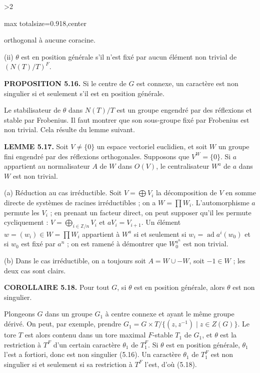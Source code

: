 \documentclass[9pt,twoside]{extarticle}
\newcommand{\EditionPage}[3]{%
  \ifnum#1>2\clearpage\fi
  \pdfbookmark[1]{Printed page #2}{fr-folio-#2}%
  \hypertarget{fr-physical-#1}{}%
  \noindent\begin{adjustbox}{max totalsize={\textwidth}{0.918\textheight},center}
  \begin{minipage}[t]{\textwidth}
  \fontsize{9.4}{11.1}\selectfont\justifying
  #3
  \end{minipage}
  \end{adjustbox}%
}
\begin{document}
\EditionPage{31}{132}{%
orthogonal à aucune coracine.\par

(ii) \(\theta\) est en position générale s'il n'est fixé par aucun élément non trivial de \((N(T)/T)^F\).\par

\noindent\textbf{PROPOSITION 5.16.} Si le centre de \(G\) est connexe, un caractère est non singulier si et seulement s'il est en position générale.\par

Le stabilisateur de \(\theta\) dans \(N(T)/T\) est un groupe engendré par des réflexions et stable par Frobenius. Il faut montrer que son sous-groupe fixé par Frobenius est non trivial. Cela résulte du lemme suivant.\par

\noindent\textbf{LEMME 5.17.} Soit \(V\ne\{0\}\) un espace vectoriel euclidien, et soit \(W\) un groupe fini engendré par des réflexions orthogonales. Supposons que \(V^W=\{0\}\). Si \(a\) appartient au normalisateur \(A\) de \(W\) dans \(O(V)\), le centralisateur \(W^a\) de \(a\) dans \(W\) est non trivial.\par

(a) Réduction au cas irréductible. Soit \(V=\bigoplus V_i\) la décomposition de \(V\) en somme directe de systèmes de racines irréductibles ; on a \(W=\prod W_i\). L'automorphisme \(a\) permute les \(V_i\) ; en prenant un facteur direct, on peut supposer qu'il les permute cycliquement : \(V=\bigoplus_{i\in\mathbb Z/n}V_i\) et \(aV_i=V_{i+1}\). Un élément \(w=(w_i)\in W=\prod W_i\) appartient à \(W^a\) si et seulement si \(w_i=\operatorname{ad}a^i(w_0)\) et si \(w_0\) est fixé par \(a^n\) ; on est ramené à démontrer que \(W_0^{a^n}\) est non trivial.\par

(b) Dans le cas irréductible, on a toujours soit \(A=W\cup -W\), soit \(-1\in W\) ; les deux cas sont clairs.\par

\noindent\textbf{COROLLAIRE 5.18.} Pour tout \(G\), si \(\theta\) est en position générale, alors \(\theta\) est non singulier.\par

Plongeons \(G\) dans un groupe \(G_1\) à centre connexe et ayant le même groupe dérivé. On peut, par exemple, prendre \(G_1=G\times T/\{(z,z^{-1})\mid z\in Z(G)\}\). Le tore \(T\) est alors contenu dans un tore maximal \(F\)-stable \(T_1\) de \(G_1\), et \(\theta\) est la restriction à \(T^F\) d'un certain caractère \(\theta_1\) de \(T_1^F\). Si \(\theta\) est en position générale, \(\theta_1\) l'est a fortiori, donc est non singulier (5.16). Un caractère \(\theta_1\) de \(T_1^F\) est non singulier si et seulement si sa restriction à \(T^F\) l'est, d'où (5.18).\par

}
\end{document}

